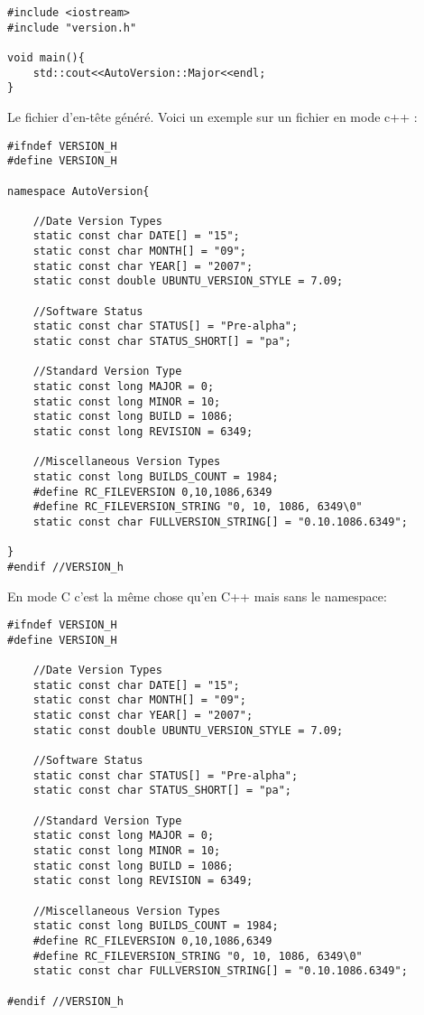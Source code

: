 \begin{lstlisting}
#include <iostream>
#include "version.h"

void main(){
    std::cout<<AutoVersion::Major<<endl;
}
\end{lstlisting}


Le fichier d'en-tête généré. Voici un exemple sur un fichier en mode c++ :

\begin{lstlisting}
#ifndef VERSION_H
#define VERSION_H

namespace AutoVersion{

	//Date Version Types
	static const char DATE[] = "15";
	static const char MONTH[] = "09";
	static const char YEAR[] = "2007";
	static const double UBUNTU_VERSION_STYLE = 7.09;

	//Software Status
	static const char STATUS[] = "Pre-alpha";
	static const char STATUS_SHORT[] = "pa";

	//Standard Version Type
	static const long MAJOR = 0;
	static const long MINOR = 10;
	static const long BUILD = 1086;
	static const long REVISION = 6349;

	//Miscellaneous Version Types
	static const long BUILDS_COUNT = 1984;
	#define RC_FILEVERSION 0,10,1086,6349
	#define RC_FILEVERSION_STRING "0, 10, 1086, 6349\0"
	static const char FULLVERSION_STRING[] = "0.10.1086.6349";

}
#endif //VERSION_h
\end{lstlisting}

En mode C c'est la même chose qu'en C++ mais sans le namespace:

\begin{lstlisting}
#ifndef VERSION_H
#define VERSION_H

	//Date Version Types
	static const char DATE[] = "15";
	static const char MONTH[] = "09";
	static const char YEAR[] = "2007";
	static const double UBUNTU_VERSION_STYLE = 7.09;

	//Software Status
	static const char STATUS[] = "Pre-alpha";
	static const char STATUS_SHORT[] = "pa";

	//Standard Version Type
	static const long MAJOR = 0;
	static const long MINOR = 10;
	static const long BUILD = 1086;
	static const long REVISION = 6349;

	//Miscellaneous Version Types
	static const long BUILDS_COUNT = 1984;
	#define RC_FILEVERSION 0,10,1086,6349
	#define RC_FILEVERSION_STRING "0, 10, 1086, 6349\0"
	static const char FULLVERSION_STRING[] = "0.10.1086.6349";

#endif //VERSION_h
\end{lstlisting}

